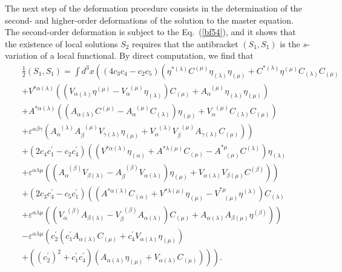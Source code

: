 \documentclass[a4paper,11pt]{article}
\begin{document}
The next step of the deformation procedure consists in the determination of
the second- and higher-order deformations of the solution to the master
equation. The second-order deformation is subject to the Eq.~(\ref{bf54}),
and it shows that the existence of local solutions $S_{2}$ requires that the
antibracket $\left( S_{1},S_{1}\right) $ is the $s$-variation of a local
functional. By direct computation, we find that
\begin{eqnarray}
&&\frac{1}{2}\left( S_{1},S_{1}\right) =\int d^{3}x\left( \left(
4c_{3}c_{4}-c_{2}c_{5}\right) \left( \eta ^{*(\lambda )}C^{(\mu )}\eta
_{(\lambda )}\eta _{(\mu )}+C^{*(\lambda )}\eta ^{(\mu )}C_{(\lambda
)}C_{(\mu )}\right. \right.  \nonumber \\
&&+V^{*\alpha (\lambda )}\left( \left( V_{\alpha (\lambda )}\eta ^{(\mu
)}-V_{\alpha }^{\;\;(\mu )}\eta _{(\lambda )}\right) C_{(\mu )}+A_{\alpha
}^{\;\;(\mu )}\eta _{(\lambda )}\eta _{(\mu )}\right)  \nonumber \\
&&+A^{*\alpha (\lambda )}\left( \left( A_{\alpha (\lambda )}C^{(\mu
)}-A_{\alpha }^{\;\;(\mu )}C_{(\lambda )}\right) \eta _{(\mu )}+V_{\alpha
}^{\;\;(\mu )}C_{(\lambda )}C_{(\mu )}\right)  \nonumber \\
&&\left. +\varepsilon ^{\alpha \beta \gamma }\left( A_{\alpha
}^{\;\;(\lambda )}A_{\beta }^{\;\;(\mu )}V_{\gamma (\lambda )}\eta _{(\mu
)}+V_{\alpha }^{\;\;(\lambda )}V_{\beta }^{\;\;(\mu )}A_{\gamma (\lambda
)}C_{(\mu )}\right) \right)  \nonumber \\
&&+\left( 2c_{4}c_{1}^{\prime }-c_{2}c_{4}^{\prime }\right) \left( \left(
V^{*\alpha (\lambda )}\eta _{(\alpha )}+A^{*\lambda (\mu )}C_{(\mu
)}-A_{\;\;\;(\mu )}^{*\mu }C^{(\lambda )}\right) \eta _{(\lambda )}\right.
\nonumber \\
&&\left. +\varepsilon ^{\alpha \lambda \mu }\left( \left( A_{\alpha
}^{\;\;(\beta )}V_{\beta (\lambda )}-A_{\beta }^{\;\;(\beta )}V_{\alpha
(\lambda )}\right) \eta _{(\mu )}+V_{\alpha (\lambda )}V_{\beta (\mu
)}C^{(\beta )}\right) \right)  \nonumber \\
&&+\left( 2c_{3}c_{4}^{\prime }-c_{5}c_{1}^{\prime }\right) \left( \left(
A^{*\alpha (\lambda )}C_{(\alpha )}+V^{*\lambda (\mu )}\eta _{(\mu
)}-V_{\;\;\;(\mu )}^{*\mu }\eta ^{(\lambda )}\right) C_{(\lambda )}\right.
\nonumber \\
&&\left. +\varepsilon ^{\alpha \lambda \mu }\left( \left( V_{\alpha
}^{\;\;(\beta )}A_{\beta (\lambda )}-V_{\beta }^{\;\;(\beta )}A_{\alpha
(\lambda )}\right) C_{(\mu )}+A_{\alpha (\lambda )}A_{\beta (\mu )}\eta
^{(\beta )}\right) \right)  \nonumber \\
&&-\varepsilon ^{\alpha \lambda \mu }\left( c_{2}^{\prime }\left(
c_{1}^{\prime }A_{\alpha (\lambda )}C_{(\mu )}+c_{4}^{\prime }V_{\alpha
(\lambda )}\eta _{(\mu )}\right) \right.  \nonumber \\
&&\left. \left. +\left( \left( c_{2}^{\prime }\right) ^{2}+c_{1}^{\prime
}c_{4}^{\prime }\right) \left( A_{\alpha (\lambda )}\eta _{(\mu )}+V_{\alpha
(\lambda )}C_{(\mu )}\right) \right) \right) .  \label{bf82}
\end{eqnarray}
\end{document}
